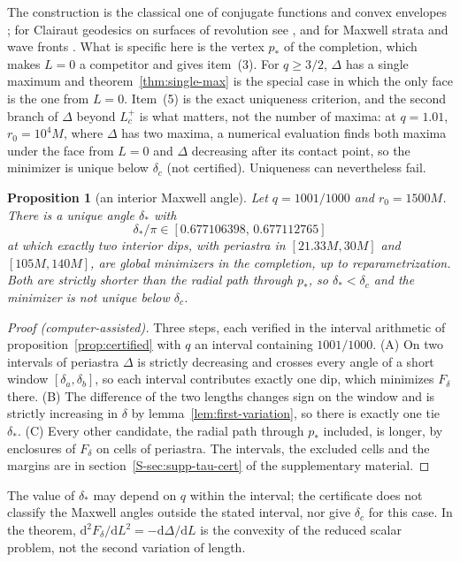 \documentclass[aip,jmp,amsmath,amssymb,reprint]{revtex4-2}
\newcommand{\dd}{\mathrm{d}}
\theoremstyle{plain}
\newtheorem{proposition}{Proposition}[section]
\theoremstyle{definition}
\begin{document}
The construction is the classical one of conjugate functions and convex envelopes
\cite{Rockafellar1970}; for Clairaut geodesics on surfaces of revolution see
\cite{SinclairTanaka2007,TanakaEtAl2022}, and for Maxwell strata and wave fronts
\cite{MoiseevSachkov2010,Arnold1990}. What is specific here is the vertex $p_*$ of the
completion, which makes $L=0$ a competitor and gives item~(3). For $q\ge3/2$, $\Delta$ has a
single maximum and theorem~\ref{thm:single-max} is the special case in which the only face is
the one from $L=0$. Item~(5) is the exact uniqueness criterion, and the second branch of
$\Delta$ beyond $L_c^+$ is what matters, not the number of maxima: at $q=1.01$, $r_0=10^4M$,
where $\Delta$ has two maxima, a numerical evaluation finds both maxima under the face from
$L=0$ and $\Delta$ decreasing after its contact point, so the minimizer is unique below
$\delta_c$ (not certified). Uniqueness can nevertheless fail.

\begin{proposition}[an interior Maxwell angle]\label{prop:maxwell-angle}
Let $q=1001/1000$ and $r_0=1500M$. There is a unique angle $\delta_*$ with
\[
  \delta_*/\pi\in[0.677106398,\,0.677112765]
\]
at which exactly two interior dips, with periastra in $[21.33M,30M]$ and $[105M,140M]$, are
global minimizers in the completion, up to reparametrization. Both are strictly shorter than
the radial path through $p_*$, so $\delta_*<\delta_c$ and the minimizer is not unique below
$\delta_c$.
\end{proposition}

\begin{proof}[Proof (computer-assisted)]
Three steps, each verified in the interval arithmetic of proposition~\ref{prop:certified} with $q$ an interval
containing $1001/1000$. (A) On two intervals of periastra $\Delta$ is strictly decreasing and crosses every angle
of a short window $[\delta_a,\delta_b]$, so each interval contributes exactly one dip, which minimizes $F_\delta$
there. (B) The difference of the two lengths changes sign on the window and is strictly increasing in $\delta$
by lemma~\ref{lem:first-variation}, so there is exactly one tie $\delta_*$. (C) Every other candidate, the radial
path through $p_*$ included, is longer, by enclosures of $F_\delta$ on cells of periastra. The intervals, the
excluded cells and the margins are in section~\ref{S-sec:supp-tau-cert} of the supplementary material.
\end{proof}

The value of $\delta_*$ may depend on $q$ within the interval; the certificate does not
classify the Maxwell angles outside the stated interval, nor give $\delta_c$ for this case.
In the theorem, $\dd^2F_\delta/\dd L^2=-\dd\Delta/\dd L$ is the convexity of the reduced scalar
problem, not the second variation of length.
\end{document}
